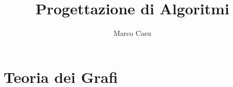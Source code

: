 \documentclass[12pt, letterpaper]{article}
\title{Progettazione di Algoritmi}
\author{Marco Casu}
\date{\vspace{-5ex}}
\begin{document}
\maketitle
\begin{figure}[h]
\end{figure}
\newpage
\tableofcontents
\newpage
\section{Teoria dei Grafi}
\end{document}
